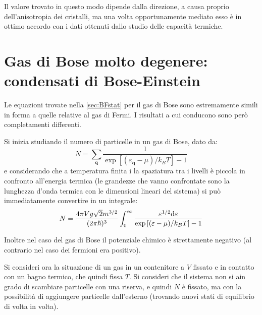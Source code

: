 Il valore trovato in questo modo dipende dalla direzione, a causa proprio dell'anisotropia dei cristalli, ma una volta opportunamente mediato esso è in ottimo accordo con i dati ottenuti dallo studio delle capacità termiche.

\section{Gas di Bose molto degenere: condensati di Bose-Einstein}
\label{sec:bosegas}

Le equazioni trovate nella \cref{sec:BFstat} per il gas di Bose sono estremamente simili in forma a quelle relative al gas di Fermi. I risultati a cui conducono sono però completamenti differenti.
\newline

Si inizia studiando il numero di particelle in un gas di Bose, dato da:
\begin{equation*}
N = \sum_{\textbf{q}}  \frac{1}{ \exp\left[(\varepsilon_{\textbf{q}} - \mu)/k_B T\right] - 1}
\end{equation*}
e considerando che a temperatura finita i la spaziatura tra i livelli è piccola in confronto all'energia termica (le grandezze che vanno confrontate sono la lunghezza d'onda termica con le dimensioni lineari del sistema) si può immediatamente convertire in un integrale:
\begin{equation*}
N =  \frac{4\pi V g \sqrt{2} m^{3/2}}{(2\pi \hbar)^3} \int_{0}^{\infty}  \frac{\varepsilon^{1/2} \dd \varepsilon}{ \exp\left[(\varepsilon - \mu)/k_B T\right] - 1}
\end{equation*}

Inoltre nel caso del gas di Bose il potenziale chimico è strettamente negativo (al contrario nel caso dei fermioni era positivo).

Si consideri ora la situazione di un gas in un contenitore a  $V$ fissato e in contatto con un bagno termico, che quindi fissa $ T $. Si consideri che il sistema non si ain grado di scambiare particelle con una riserva, e quindi $N$ è fissato, ma con la possibilità di aggiungere particelle dall'esterno (trovando nuovi stati di equilibrio di volta in volta).


